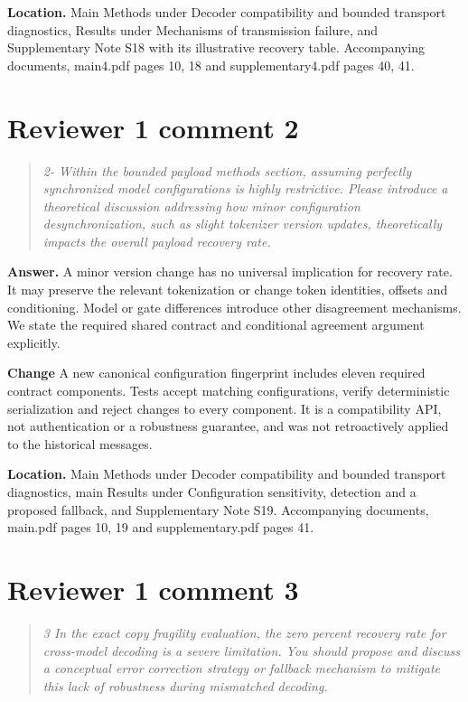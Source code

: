 \documentclass[11pt]{article}
\newenvironment{reviewcomment}{\begin{quote}\color{commentgray}\itshape}{\end{quote}}
\begin{document}
\textbf{Location.} Main Methods under Decoder compatibility and bounded transport diagnostics, Results under Mechanisms of transmission failure, and Supplementary Note S18 with its illustrative recovery table. Accompanying documents, main4.pdf pages 10, 18 and supplementary4.pdf pages 40, 41.


\section*{Reviewer 1 comment 2}\label{resp:R1-2}
\begin{reviewcomment}
2- Within the bounded payload methods section, assuming perfectly synchronized model configurations is highly restrictive. Please introduce a theoretical discussion addressing how minor configuration desynchronization, such as slight tokenizer version updates, theoretically impacts the overall payload recovery rate.
\end{reviewcomment}

\textbf{Answer.} A minor version change has no universal implication for recovery rate. It may preserve the relevant tokenization or change token identities, offsets and conditioning. Model or gate differences introduce other disagreement mechanisms. We state the required shared contract and conditional agreement argument explicitly.

\textbf{Change} A new canonical configuration fingerprint includes eleven required contract components. Tests accept matching configurations, verify deterministic serialization and reject changes to every component. It is a compatibility API, not authentication or a robustness guarantee, and was not retroactively applied to the historical messages.

\textbf{Location.} Main Methods under Decoder compatibility and bounded transport diagnostics, main Results under Configuration sensitivity, detection and a proposed fallback, and Supplementary Note S19. Accompanying documents, main.pdf pages 10, 19 and supplementary.pdf pages 41.


\section*{Reviewer 1 comment 3}\label{resp:R1-3}
\begin{reviewcomment}
3 In the exact copy fragility evaluation, the zero percent recovery rate for cross-model decoding is a severe limitation. You should propose and discuss a conceptual error correction strategy or fallback mechanism to mitigate this lack of robustness during mismatched decoding.
\end{reviewcomment}
\end{document}

